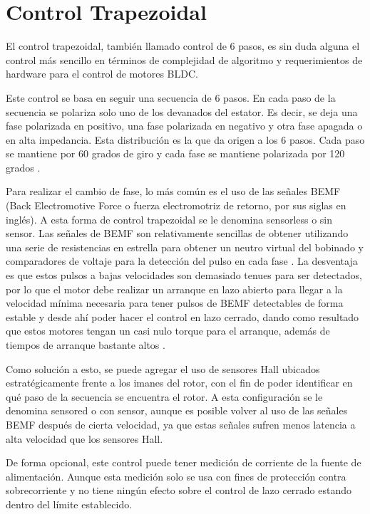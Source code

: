 \documentclass[11pt]{report}
\begin{document}
\section{Control Trapezoidal}
El control trapezoidal, también llamado control de 6 pasos, es sin duda alguna el control más sencillo en términos de complejidad de algoritmo y requerimientos de hardware para el control de motores BLDC.

Este control se basa en seguir una secuencia de 6 pasos. En cada paso de la secuencia se polariza solo uno de los devanados del estator. Es decir, se deja una fase polarizada en positivo, una fase polarizada en negativo y otra fase apagada o en alta impedancia. Esta distribución es la que da origen a los 6 pasos. Cada paso se mantiene por 60 grados de giro y cada fase se mantiene polarizada por 120 grados \cite{fisher2014high_STEP}.

Para realizar el cambio de fase, lo más común es el uso de las señales BEMF (Back Electromotive Force o fuerza electromotriz de retorno, por sus siglas en inglés). A esta forma de control trapezoidal se le denomina sensorless o sin sensor. Las señales de BEMF son relativamente sencillas de obtener utilizando una serie de resistencias en estrella para obtener un neutro virtual del bobinado y comparadores de voltaje para la detección del pulso en cada fase \cite{shao2003direct_STEP}. La desventaja es que estos pulsos a bajas velocidades son demasiado tenues para ser detectados, por lo que el motor debe realizar un arranque en lazo abierto para llegar a la velocidad mínima necesaria para tener pulsos de BEMF detectables de forma estable y desde ahí poder hacer el control en lazo cerrado, dando como resultado que estos motores tengan un casi nulo torque para el arranque, además de tiempos de arranque bastante altos \cite{Gualtieri2018_STEP}.

Como solución a esto, se puede agregar el uso de sensores Hall ubicados estratégicamente frente a los imanes del rotor, con el fin de poder identificar en qué paso de la secuencia se encuentra el rotor. A esta configuración se le denomina sensored o con sensor, aunque es posible volver al uso de las señales BEMF después de cierta velocidad, ya que estas señales sufren menos latencia a alta velocidad que los sensores Hall.

De forma opcional, este control puede tener medición de corriente de la fuente de alimentación. Aunque esta medición solo se usa con fines de protección contra sobrecorriente y no tiene ningún efecto sobre el control de lazo cerrado estando dentro del límite establecido.
\end{document}
